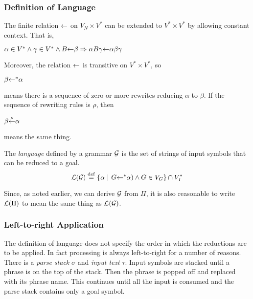 \begin{enumerate}
\subsubsection{Definition of Language}

The finite relation $\mbox{$\leftarrow$}$ on $V_N \times V^*$ can be 
extended to $V^* \times V^*$ by allowing constant context.  That is, 

\begin{center}
$\alpha \in V^* \wedge \gamma \in V^* \wedge B\mbox{$\leftarrow$}\beta
\Rightarrow \alpha B \gamma \mbox{$\leftarrow$} \alpha\beta\gamma$
\end{center}

\noindent
Moreover, the relation $\mbox{$\leftarrow$}$ is transitive on $V^*\times V^*$, so 

\begin{center}$\beta\mbox{$\leftarrow$}^*\alpha$\end{center}

\noindent
means there is a sequence of zero or more rewrites 
reducing $\alpha$ to $\beta$.  
If the sequence of rewriting rules is $\rho$, then

\begin{center}$\beta{\stackrel{\rho}{\mbox{$\leftarrow$}}}\alpha$\end{center}

\noindent means the same thing.

The {\em language} defined by a grammar $\cal G$ is the 
set of strings of input symbols that can be reduced to a goal.
\begin{displaymath}
{\cal L(G)}  \stackrel{\rm def}{=}
	\{\alpha\ |\ G\mbox{$\leftarrow$}^*\alpha) \wedge G \in V_G\} \cap V_I^*
\end{displaymath}

Since, as noted earlier, we can derive $\cal G$ from $\Pi$, it is also
reasonable to write ${\cal L}(\Pi)$ to mean the same thing as $\cal L(G)$.

\subsubsection{Left-to-right Application}

The definition of language does not specify the order in which the 
reductions are to be applied.  
In fact processing is always left-to-right for a number of reasons.  
There is a {\em parse stack\/} $\sigma$ and {\em input text\/} $\tau$.
Input symbols are stacked until a phrase is on the top of the stack.  
Then the phrase is popped off and replaced with its phrase name.  
This continues until all the input is consumed and 
the parse stack contains only a goal symbol.


\end{enumerate}
